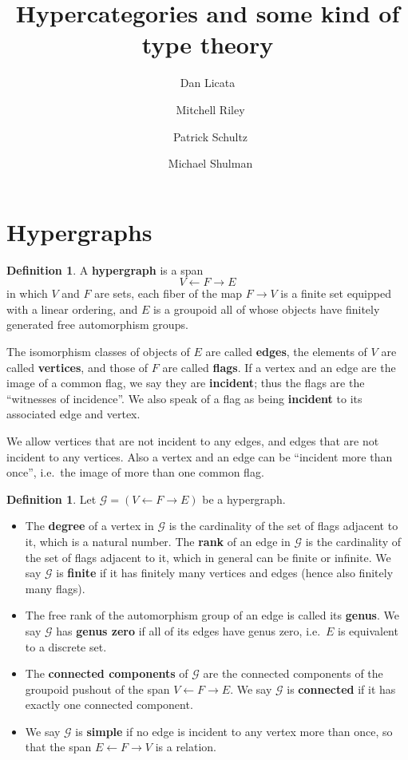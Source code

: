 \documentclass{article}
\title{Hypercategories and some kind of type theory}
\author{Dan Licata \and\ Mitchell Riley \and\ Patrick Schultz \and\ Michael Shulman}
\theoremstyle{definition}
\newtheorem{defn}[thm]{Definition}
\theoremstyle{remark}
\def\G{\mathcal{G}}
\let\ot\leftarrow
\begin{document}
\maketitle

\section{Hypergraphs}
\label{sec:hypergraphs}

\begin{defn}
  A \textbf{hypergraph} is a span
  \[ V \ot F \to E \]
  in which $V$ and $F$ are sets, each fiber of the map $F\to V$ is a finite set equipped with a linear ordering, and $E$ is a groupoid all of whose objects have finitely generated free automorphism groups.

  The isomorphism classes of objects of $E$ are called \textbf{edges}, the elements of $V$ are called \textbf{vertices}, and those of $F$ are called \textbf{flags}.
  If a vertex and an edge are the image of a common flag, we say they are \textbf{incident}; thus the flags are the ``witnesses of incidence''.
  We also speak of a flag as being \textbf{incident} to its associated edge and vertex.
\end{defn}

We allow vertices that are not incident to any edges, and edges that are not incident to any vertices.
Also a vertex and an edge can be ``incident more than once'', i.e.\ the image of more than one common flag.

\begin{defn}
  Let $\G=(V\ot F\to E)$ be a hypergraph.
  \begin{itemize}
  \item The \textbf{degree} of a vertex in $\G$ is the cardinality of the set of flags adjacent to it, which is a natural number.
    The \textbf{rank} of an edge in $\G$ is the cardinality of the set of flags adjacent to it, which in general can be finite or infinite.
    We say $\G$ %
    is \textbf{finite} if it has finitely many vertices and edges (hence also finitely many flags).
  \item The free rank of the automorphism group of an edge is called its \textbf{genus}.
    We say $\G$ has \textbf{genus zero} if all of its edges have genus zero, i.e.\ $E$ is equivalent to a discrete set.
  \item The \textbf{connected components} of $\G$ are the connected components of the groupoid pushout of the span $V \leftarrow F \to E$.
    We say $\G$ is \textbf{connected} if it has exactly one connected component.
  \item We say $\G$ is \textbf{simple} if no edge is incident to any vertex more than once, so that the span $E \ot F \to V$ is a relation.
  \end{itemize}
\end{defn}
\end{document}
